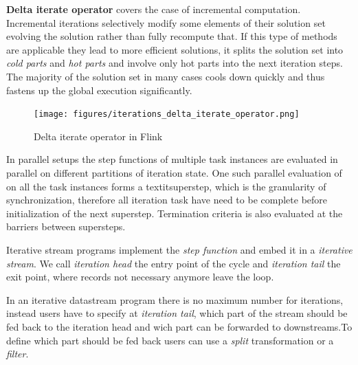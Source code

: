 \textbf{Delta iterate operator} covers the case of incremental computation. Incremental iterations selectively modify some elements of their solution set evolving the solution rather than fully recompute that. If this type of methods are applicable they lead to more efficient solutions, it splits the solution set into \textit{cold parts} and \textit{hot parts} and involve only hot parts into the next iteration steps. The majority of the solution set in many cases cools down quickly and thus fastens up the global execution significantly.
\begin{figure}[!ht]
  \centering    
      \texttt{[image: figures/iterations\_delta\_iterate\_operator.png]}
  \caption{Delta iterate operator in Flink\cite{flink_doc_iteration}}
  \label{fig:iterations_iterate_operator}
\end{figure}
In parallel setups the step functions of multiple task instances are evaluated in parallel on different partitions of iteration state. One such parallel evaluation of on all the task instances forms a textit{superstep}, which is the granularity of synchronization, therefore all iteration task have need to be complete before initialization of the next superstep. Termination criteria is also evaluated at the barriers between supersteps.	
\cite{flink_doc_iteration}

Iterative stream programs implement the \textit{step function} and embed it in a \textit{iterative stream}. We call \textit{iteration head} the entry point of the cycle and \textit{iteration tail} the exit point, where records not necessary anymore leave the loop.

In an iterative datastream program there is no maximum number for iterations, instead users have to specify at \textit{iteration tail}, which part of the stream should be fed back to the iteration head and wich part can be forwarded to downstreams.To define which part should be fed back users can use a \textit{split} transformation or a \textit{filter}.




